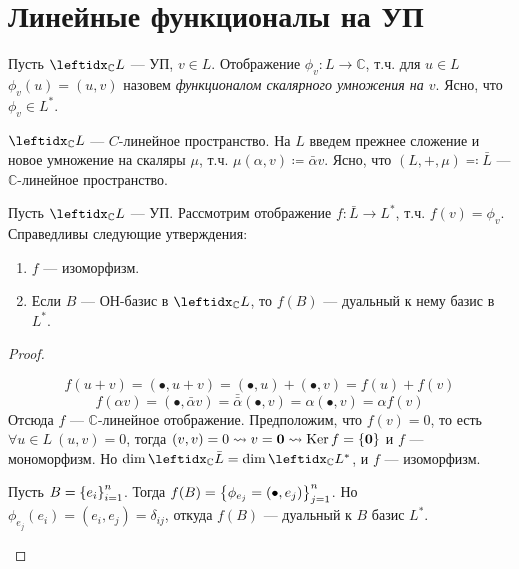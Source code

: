 \section{Линейные функционалы на УП}

\begin{defn}
    Пусть $\lsub{\mathbb{C}}{L}$ --- УП, $v \in L$. Отображение $\phi_v \colon L \to \mathbb{C}$, т.ч. для $u \in L$ $\phi_v(u) = (u, v)$ назовем \textit{функционалом скалярного умножения на $v$}. Ясно, что $\phi_v \in L^*$.
\end{defn}

\begin{defn}
    $\lsub{\mathbb{C}}{L}$ --- $C$-линейное пространство. На $L$ введем прежнее сложение и новое умножение на скаляры $\mu$, т.ч. $\mu(\alpha, v) \coloneqq \bar{\alpha} v$. Ясно, что $(L, +, \mu) \eqqcolon \bar{L}$ --- $\mathbb{C}$-линейное пространство.
\end{defn}

\begin{thm*}
    Пусть $\lsub{\mathbb{C}}{L}$ --- УП. Рассмотрим отображение $f \colon \bar{L} \to L^*$, т.ч. $f(v) = \phi_v$. Справедливы следующие утверждения:
    \begin{enumerate}
        \item $f$ --- изоморфизм.
        \item Если $B$ --- ОН-базис в $\lsub{\mathbb{C}}{L}$, то $f(B)$ --- дуальный к нему базис в $L^*$.
    \end{enumerate}
\end{thm*}

\begin{proof}
    \begin{proofpart}
        $$f(u + v) = (\bullet, u + v) = (\bullet, u) + (\bullet, v) = f(u) + f(v)$$
        $$f(\alpha v) = (\bullet, \bar{\alpha}v) = \bar{\bar{\alpha}}(\bullet, v) = \alpha(\bullet, v) = \alpha f(v)$$
        Отсюда $f$ --- $\mathbb{C}$-линейное отображение. Предположим, что $f(v) = 0$, то есть $\forall u \in L\ (u, v) = 0$, тогда $(v, v) = 0 \leadsto v = \mathbf{0} \leadsto \operatorname{Ker} f = \{\mathbf{0}\}$ и $f$ --- мономорфизм. Но $\dim \lsub{\mathbb{C}}{\bar{L}} = \dim \lsub{\mathbb{C}}{L^*}$, и $f$ --- изоморфизм.
    \end{proofpart}
    \begin{proofpart}
        Пусть $B = \left\{e_i\right\}_{i=1}^{n}$. Тогда $f(B) = \left\{\phi_{e_j} = (\bullet, e_j)\right\}_{j=1}^{n}$. Но $\phi_{e_j}(e_i) = (e_i, e_j) = \delta_{ij}$, откуда $f(B)$ --- дуальный к $B$ базис $L^*$.
    \end{proofpart}
\end{proof}